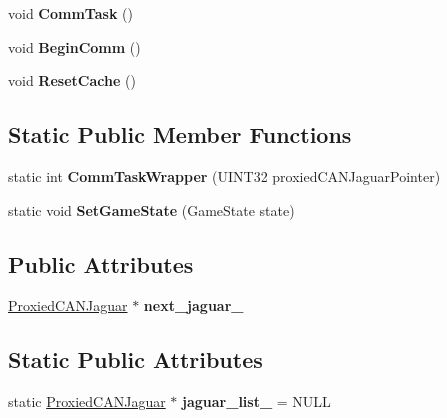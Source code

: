 \begin{DoxyCompactItemize}
\item 
\hypertarget{class_proxied_c_a_n_jaguar_aab16484c2f7b82c43e132b27eb4649a2}{
void {\bfseries \-Comm\-Task} ()}
\label{class_proxied_c_a_n_jaguar_aab16484c2f7b82c43e132b27eb4649a2}

\item 
\hypertarget{class_proxied_c_a_n_jaguar_ac74b7b952bb5c6d53554f641f4a5b91e}{
void {\bfseries \-Begin\-Comm} ()}
\label{class_proxied_c_a_n_jaguar_ac74b7b952bb5c6d53554f641f4a5b91e}

\item 
\hypertarget{class_proxied_c_a_n_jaguar_a9d980fb9e94eec6788076d290bbb8a04}{
void {\bfseries \-Reset\-Cache} ()}
\label{class_proxied_c_a_n_jaguar_a9d980fb9e94eec6788076d290bbb8a04}

\end{DoxyCompactItemize}
\subsection*{\-Static \-Public \-Member \-Functions}
\begin{DoxyCompactItemize}
\item 
\hypertarget{class_proxied_c_a_n_jaguar_a0b72d67d4484e8e24c81dc7b28db1ef5}{
static int {\bfseries \-Comm\-Task\-Wrapper} (\-U\-I\-N\-T32 proxied\-C\-A\-N\-Jaguar\-Pointer)}
\label{class_proxied_c_a_n_jaguar_a0b72d67d4484e8e24c81dc7b28db1ef5}

\item 
\hypertarget{class_proxied_c_a_n_jaguar_a2903fcf0cd77a9fba6ad4cf298981b7c}{
static void {\bfseries \-Set\-Game\-State} (\-Game\-State state)}
\label{class_proxied_c_a_n_jaguar_a2903fcf0cd77a9fba6ad4cf298981b7c}

\end{DoxyCompactItemize}
\subsection*{\-Public \-Attributes}
\begin{DoxyCompactItemize}
\item 
\hypertarget{class_proxied_c_a_n_jaguar_a08bae8b9c2d7e68697fcb088f7bdc2e4}{
\hyperlink{class_proxied_c_a_n_jaguar}{\-Proxied\-C\-A\-N\-Jaguar} $\ast$ {\bfseries next\-\_\-jaguar\-\_\-}}
\label{class_proxied_c_a_n_jaguar_a08bae8b9c2d7e68697fcb088f7bdc2e4}

\end{DoxyCompactItemize}
\subsection*{\-Static \-Public \-Attributes}
\begin{DoxyCompactItemize}
\item 
\hypertarget{class_proxied_c_a_n_jaguar_a08b48a091bcf2b9adcb5e7d7303e1027}{
static \hyperlink{class_proxied_c_a_n_jaguar}{\-Proxied\-C\-A\-N\-Jaguar} $\ast$ {\bfseries jaguar\-\_\-list\-\_\-} = \-N\-U\-L\-L}
\label{class_proxied_c_a_n_jaguar_a08b48a091bcf2b9adcb5e7d7303e1027}

\end{DoxyCompactItemize}


